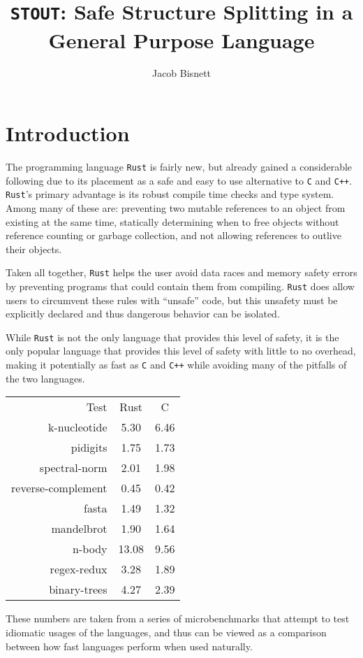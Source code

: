 \documentclass[prodmode,acmtecs]{acmsmall} %
\newcommand{\rustname}{{\texttt{Rust}}}
\def \rust {\rustname{}\xspace}
\newcommand{\cname}{{\texttt{C}}}
\def \c {\cname{}\xspace}
\newcommand{\cppname}{{\texttt{C++}}}
\def \cpp {\cppname{}\xspace}
\newcommand{\projectname}{{\texttt{STOUT}}}
\def \name{\projectname\xspace}
\begin{document}
\title{\name: Safe Structure Splitting in a General Purpose Language}
\author{Jacob Bisnett}
\maketitle
\pagestyle{fancy}
\section{Introduction}
\doublespacing
\label{sec:intro}

The programming language \rust is fairly new, but already gained a considerable
following due to its placement as a safe and easy to use alternative to \c and
\cpp. \rust's primary advantage is its robust compile time checks and type
system. Among many of these are:
preventing two mutable references to an object from existing at the same time, 
statically determining when to free objects without reference counting or
garbage collection,
and not allowing references to outlive their objects.

Taken all together, \rust helps the user avoid data races and memory safety
errors by preventing programs that could contain them from compiling.
\rust does allow users to circumvent these rules with ``unsafe'' code,
but this unsafety must be explicitly declared and thus dangerous behavior can be
isolated.

While \rust is not the only language that provides this level of safety, it is
the only popular language that provides this level of safety with little to no overhead,
making it potentially as fast as \c and \cpp while avoiding many of the
pitfalls of the two languages.

\begin{listing}
  \centering
\begin{tabular}{r|c|c}
  Test&Rust&C\\
  k-nucleotide&5.30&6.46\\
  pidigits&1.75&1.73\\
  spectral-norm&2.01&1.98\\
  reverse-complement&0.45&0.42\\
  fasta&1.49&1.32\\
  mandelbrot&1.90&1.64\\
  n-body&13.08&9.56\\
  regex-redux&3.28&1.89\\
  binary-trees&4.27&2.39\\
\end{tabular}

  These numbers are taken from a series of microbenchmarks that attempt to 
  test idiomatic usages of the languages, and thus can be viewed as a comparison
  between how fast languages perform when used naturally.\cite{bench}
  \caption{Rust vs C Microbenchmarks}
  \label{fig:bench}
\end{listing}
\end{document}
